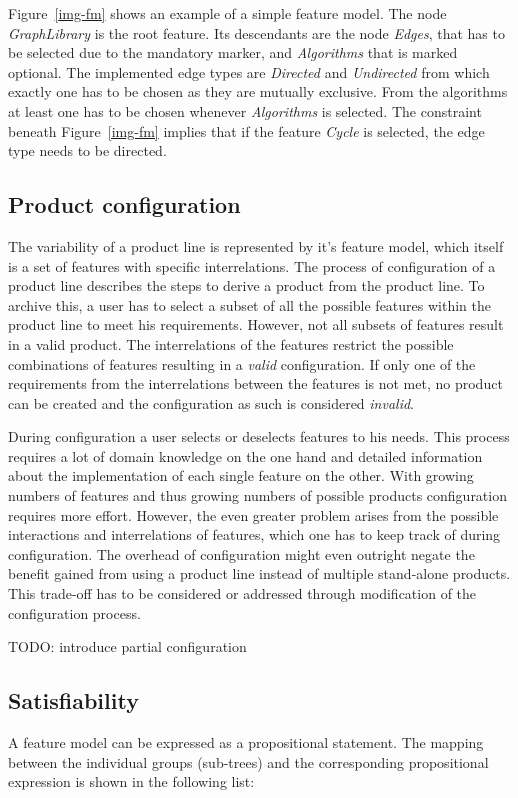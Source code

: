 Figure~\ref{img-fm} shows an example of a simple feature model. The node \textit{GraphLibrary} is the root feature. Its descendants are the node \textit{Edges}, that has to be selected due to the mandatory marker, and \textit{Algorithms} that is marked optional. The implemented edge types are \textit{Directed} and \textit{Undirected} from which exactly one has to be chosen as they are mutually exclusive. From the algorithms at least one has to be chosen whenever \textit{Algorithms} is selected. The constraint beneath Figure~\ref{img-fm} implies that if the feature \textit{Cycle} is selected, the edge type needs to be directed.

\subsection{Product configuration}
The variability of a product line is represented by it's feature model, which itself is a set of features with specific interrelations. The process of configuration of a product line describes the steps to derive a product from the product line. To archive this, a user has to select a subset of all the possible features within the product line to meet his requirements. However, not all subsets of features result in a valid product. The interrelations of the features restrict the possible combinations of features resulting in a \textit{valid} configuration. If only one of the requirements from the interrelations between the features is not met, no product can be created and the configuration as such is considered \textit{invalid}.

During configuration a user selects or deselects features to his needs. This process requires a lot of domain knowledge on the one hand and detailed information about the implementation of each single feature on the other. With growing numbers of features and thus growing numbers of possible products configuration requires more effort. However, the even greater problem arises from the possible interactions and interrelations of features, which one has to keep track of during configuration. The overhead of configuration might even outright negate the benefit gained from using a product line instead of multiple stand-alone products. This trade-off has to be considered or addressed through modification of the configuration process.

{\color{red}TODO: introduce partial configuration}

\subsection{Satisfiability}
A feature model can be expressed as a propositional statement. The mapping between the individual groups (sub-trees) and the corresponding propositional expression is shown in the following list:


